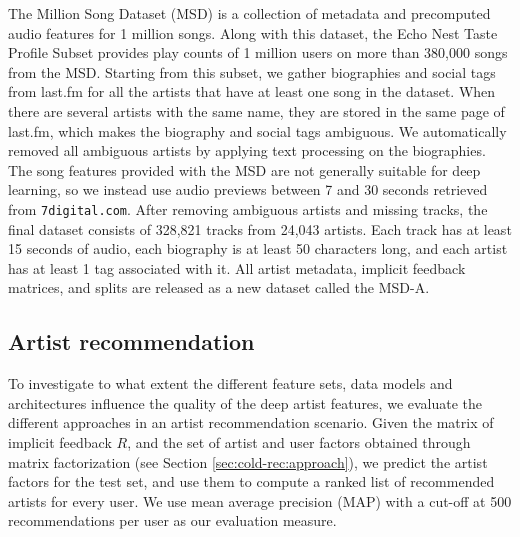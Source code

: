 The Million Song Dataset (MSD) \citep{McFee2012} is a collection of metadata and precomputed audio features for 1 million songs. 
Along with this dataset, the Echo Nest Taste Profile Subset \citep{Bertin-Mahieux2011} provides play counts of 1 million users on more than 380,000 songs from the MSD.
Starting from this subset, we gather biographies and social tags from last.fm for all the artists that have at least one song in the dataset.
When there are several artists with the same name, they are stored in the same page of last.fm, which makes the biography and social tags ambiguous. 
We automatically removed all ambiguous artists by applying text processing on the biographies. 
The song features provided with the MSD are not generally suitable for deep learning, so we instead use audio previews between 7 and 30 seconds retrieved from \texttt{7digital.com}.
After removing ambiguous artists and missing tracks, the final dataset consists of 328,821 tracks from 24,043 artists. 
Each track has at least 15 seconds of audio, each biography is at least 50 characters long, and each artist has at least 1 tag associated with it. All artist metadata, implicit feedback matrices, and splits are released as a new dataset called the MSD-A.%

\subsection{Artist recommendation}
\label{sec:cold-rec:artist-rec}

To investigate to what extent the different feature sets, data models and architectures influence the quality of the deep artist features, we evaluate the different approaches in an artist recommendation scenario. Given the matrix of implicit feedback $R$, and the set of artist and user factors obtained through matrix factorization (see Section \ref{sec:cold-rec:approach}), we predict the artist factors for the test set, and use them to compute a ranked list of recommended artists for every user. We use mean average precision (MAP) with a cut-off at 500 recommendations per user as our evaluation measure. 

